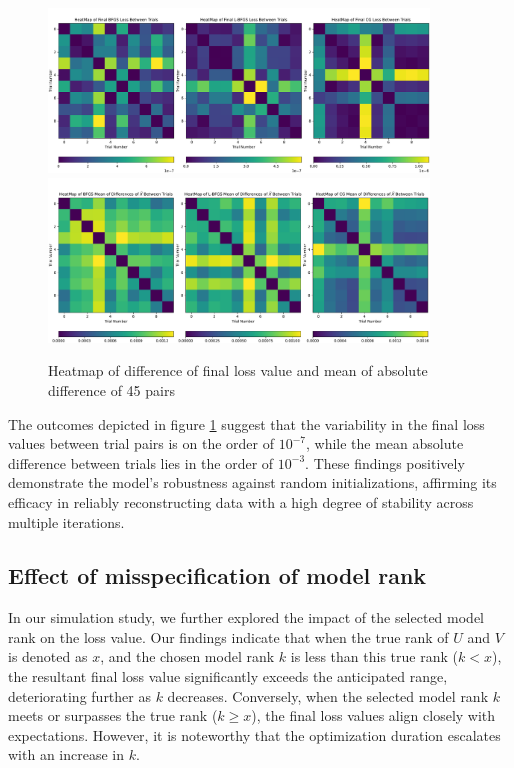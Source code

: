 \documentclass{article}
\begin{document}
\begin{figure}[ht]
    \centering
    \includegraphics[width=0.9\textwidth]{heatmap_loss.pdf}
    \includegraphics[width=0.9\textwidth]{heatmap_diff.pdf}
    \caption{Heatmap of difference of final loss value and mean of absolute difference of 45 pairs}
    \label{Heatmap}
\end{figure}


The outcomes depicted in figure \ref{Heatmap} suggest that the variability in the final loss values between trial pairs is on the order of $10^{-7}$, while the mean absolute difference between trials lies in the order of $10^{-3}$. These findings positively demonstrate the model's robustness against random initializations, affirming its efficacy in reliably reconstructing data with a high degree of stability across multiple iterations.

\subsection{Effect of misspecification of model rank}
In our simulation study, we further explored the impact of the selected model rank on the loss value. Our findings indicate that when the true rank of $U$ and $V$ is denoted as $x$, and the chosen model rank $k$ is less than this true rank ($k < x$), the resultant final loss value significantly exceeds the anticipated range, deteriorating further as $k$ decreases. Conversely, when the selected model rank $k$ meets or surpasses the true rank ($k \geq x$), the final loss values align closely with expectations. However, it is noteworthy that the optimization duration escalates with an increase in $k$.
\end{document}
